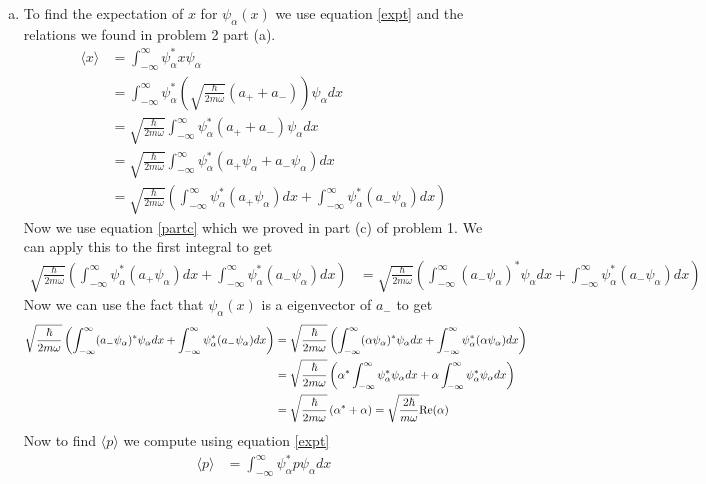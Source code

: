 \documentclass[11pt]{article}
\numberwithin{equation}{section}
\newcommand{\expt}[1]{\langle{#1}\rangle}
\begin{document}
\begin{enumerate}[(a)]
\item
To find the expectation of $x$ for $\psi_{\alpha}(x)$ we use equation \ref{expt} and the relations we found in problem 2 part (a). 
\begin{align*}
\expt{x} &= \int_{-\infty}^{\infty}\psi_{\alpha}^*x\psi_{\alpha}\\
&= \int_{-\infty}^{\infty}\psi_{\alpha}^*\left(\sqrt{\frac{\hbar}{2m\omega}}(a_++a_-)\right)\psi_{\alpha}dx\\
&= \sqrt{\frac{\hbar}{2m\omega}}\int_{-\infty}^{\infty}\psi_{\alpha}^*(a_++a_-)\psi_{\alpha}dx\\
&= \sqrt{\frac{\hbar}{2m\omega}}\int_{-\infty}^{\infty}\psi_{\alpha}^*(a_+\psi_{\alpha}+a_-\psi_{\alpha})dx\\
&= \sqrt{\frac{\hbar}{2m\omega}}\left(\int_{-\infty}^{\infty}\psi_{\alpha}^*(a_+\psi_{\alpha})dx+\int_{-\infty}^{\infty}\psi_{\alpha}^*(a_-\psi_{\alpha})dx\right)
\end{align*}
Now we use equation \ref{partc} which we proved in part (c) of problem 1. We can apply this to the first integral to get
\begin{align*}
 \sqrt{\frac{\hbar}{2m\omega}}\left(\int_{-\infty}^{\infty}\psi_{\alpha}^*(a_+\psi_{\alpha})dx+\int_{-\infty}^{\infty}\psi_{\alpha}^*(a_-\psi_{\alpha})dx\right) &= \sqrt{\frac{\hbar}{2m\omega}}\left(\int_{-\infty}^{\infty}(a_-\psi_{\alpha})^*\psi_{\alpha}dx+\int_{-\infty}^{\infty}\psi_{\alpha}^*(a_-\psi_{\alpha})dx\right)
\end{align*}
Now we can use the fact that $\psi_{\alpha}(x)$ is a eigenvector of $a_-$ to get
\begin{align*}
\sqrt{\frac{\hbar}{2m\omega}}\left(\int_{-\infty}^{\infty}(a_-\psi_{\alpha})^*\psi_{\alpha}dx+\int_{-\infty}^{\infty}\psi_{\alpha}^*(a_-\psi_{\alpha})dx\right) &= \sqrt{\frac{\hbar}{2m\omega}}\left(\int_{-\infty}^{\infty}(\alpha\psi_{\alpha})^*\psi_{\alpha}dx+\int_{-\infty}^{\infty}\psi_{\alpha}^*(\alpha\psi_{\alpha})dx\right) \\
&= \sqrt{\frac{\hbar}{2m\omega}}\left(\alpha^*\int_{-\infty}^{\infty}\psi_{\alpha}^*\psi_{\alpha}dx+\alpha\int_{-\infty}^{\infty}\psi_{\alpha}^*\psi_{\alpha}dx\right) \\
&= \sqrt{\frac{\hbar}{2m\omega}}\left(\alpha^*+\alpha\right) = \sqrt{\frac{2\hbar}{m\omega}}\textnormal{Re}(\alpha) 
\end{align*}
Now to find $\expt{p}$ we compute using equation \ref{expt}
\begin{align*}
\expt{p} &= \int_{-\infty}^{\infty}\psi_{\alpha}^*p\psi_{\alpha}dx\\

\end{align*}
\end{enumerate}
\end{document}
